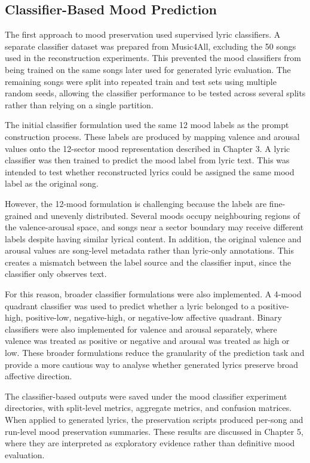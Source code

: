 \subsection{Classifier-Based Mood Prediction}

The first approach to mood preservation used supervised lyric classifiers. A separate classifier dataset was prepared from Music4All, excluding the 50 songs used in the reconstruction experiments. This prevented the mood classifiers from being trained on the same songs later used for generated lyric evaluation. The remaining songs were split into repeated train and test sets using multiple random seeds, allowing the classifier performance to be tested across several splits rather than relying on a single partition.

The initial classifier formulation used the same 12 mood labels as the prompt construction process. These labels are produced by mapping valence and arousal values onto the 12-sector mood representation described in Chapter 3. A lyric classifier was then trained to predict the mood label from lyric text. This was intended to test whether reconstructed lyrics could be assigned the same mood label as the original song.

However, the 12-mood formulation is challenging because the labels are fine-grained and unevenly distributed. Several moods occupy neighbouring regions of the valence-arousal space, and songs near a sector boundary may receive different labels despite having similar lyrical content. In addition, the original valence and arousal values are song-level metadata rather than lyric-only annotations. This creates a mismatch between the label source and the classifier input, since the classifier only observes text.

For this reason, broader classifier formulations were also implemented. A 4-mood quadrant classifier was used to predict whether a lyric belonged to a positive-high, positive-low, negative-high, or negative-low affective quadrant. Binary classifiers were also implemented for valence and arousal separately, where valence was treated as positive or negative and arousal was treated as high or low. These broader formulations reduce the granularity of the prediction task and provide a more cautious way to analyse whether generated lyrics preserve broad affective direction.

The classifier-based outputs were saved under the mood classifier experiment directories, with split-level metrics, aggregate metrics, and confusion matrices. When applied to generated lyrics, the preservation scripts produced per-song and run-level mood preservation summaries. These results are discussed in Chapter 5, where they are interpreted as exploratory evidence rather than definitive mood evaluation.

